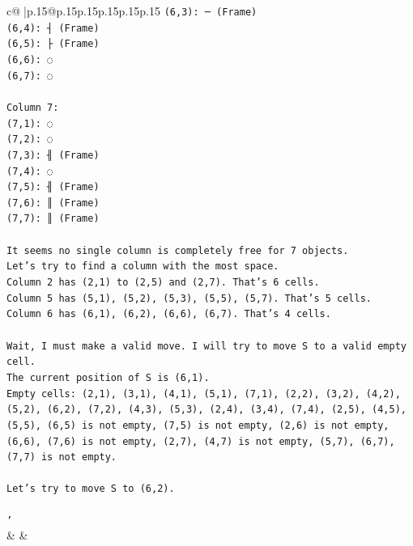 \documentclass{article}
\begin{document}
{\begin{supertabular}{c@{$\;$}|p{.15\linewidth}@{}p{.15\linewidth}p{.15\linewidth}p{.15\linewidth}p{.15\linewidth}p{.15\linewidth}}
{{{\texttt{(6,3): ─ (Frame)} \\
\texttt{(6,4): ┤ (Frame)} \\
\texttt{(6,5): ├ (Frame)} \\
\texttt{(6,6): ◌} \\
\texttt{(6,7): ◌} \\
\\ 
\texttt{Column 7:} \\
\texttt{(7,1): ◌} \\
\texttt{(7,2): ◌} \\
\texttt{(7,3): ╢ (Frame)} \\
\texttt{(7,4): ◌} \\
\texttt{(7,5): ╢ (Frame)} \\
\texttt{(7,6): ║ (Frame)} \\
\texttt{(7,7): ║ (Frame)} \\
\\ 
\texttt{It seems no single column is completely free for 7 objects.} \\
\texttt{Let's try to find a column with the most space.} \\
\texttt{Column 2 has (2,1) to (2,5) and (2,7). That's 6 cells.} \\
\texttt{Column 5 has (5,1), (5,2), (5,3), (5,5), (5,7). That's 5 cells.} \\
\texttt{Column 6 has (6,1), (6,2), (6,6), (6,7). That's 4 cells.} \\
\\ 
\texttt{Wait, I must make a valid move. I will try to move S to a valid empty cell.} \\
\texttt{The current position of S is (6,1).} \\
\texttt{Empty cells: (2,1), (3,1), (4,1), (5,1), (7,1), (2,2), (3,2), (4,2), (5,2), (6,2), (7,2), (4,3), (5,3), (2,4), (3,4), (7,4), (2,5), (4,5), (5,5), (6,5) is not empty, (7,5) is not empty, (2,6) is not empty, (6,6), (7,6) is not empty, (2,7), (4,7) is not empty, (5,7), (6,7), (7,7) is not empty.} \\
\\ 
\texttt{Let's try to move S to (6,2).} \\
\\ 
\texttt{'} \\
            }
        }
    }
    & & \\ \\


\end{supertabular}}
\end{document}
